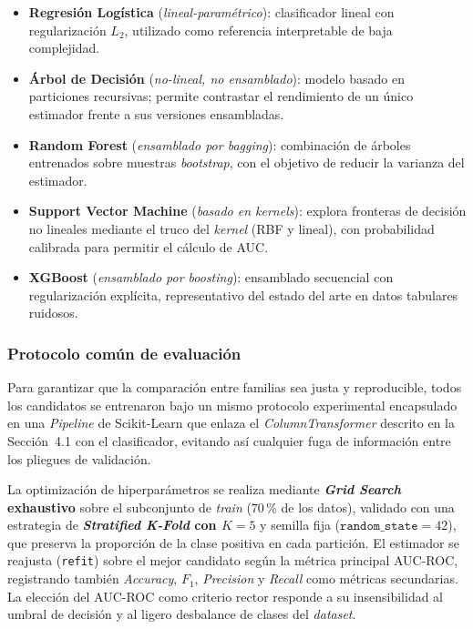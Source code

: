 \documentclass[11pt,a4paper]{article}
\begin{document}
\begin{itemize}
    \item \textbf{Regresión Logística} (\textit{lineal-paramétrico}): clasificador lineal con regularización $L_2$, utilizado como referencia interpretable de baja complejidad.
    \item \textbf{Árbol de Decisión} (\textit{no-lineal, no ensamblado}): modelo basado en particiones recursivas; permite contrastar el rendimiento de un único estimador frente a sus versiones ensambladas.
    \item \textbf{Random Forest} (\textit{ensamblado por \textit{bagging}}): combinación de árboles entrenados sobre muestras \textit{bootstrap}, con el objetivo de reducir la varianza del estimador.
    \item \textbf{Support Vector Machine} (\textit{basado en \textit{kernels}}): explora fronteras de decisión no lineales mediante el truco del \textit{kernel} (RBF y lineal), con probabilidad calibrada para permitir el cálculo de AUC.
    \item \textbf{XGBoost} (\textit{ensamblado por \textit{boosting}}): ensamblado secuencial con regularización explícita, representativo del estado del arte en datos tabulares ruidosos.
\end{itemize}

\subsubsection{Protocolo común de evaluación}

Para garantizar que la comparación entre familias sea justa y reproducible, todos los candidatos se entrenaron bajo un mismo protocolo experimental encapsulado en una \textit{Pipeline} de Scikit-Learn que enlaza el \textit{ColumnTransformer} descrito en la Sección~4.1 con el clasificador, evitando así cualquier fuga de información entre los pliegues de validación.

La optimización de hiperparámetros se realiza mediante \textbf{\textit{Grid Search} exhaustivo} sobre el subconjunto de \textit{train} (70\,\% de los datos), validado con una estrategia de \textbf{\textit{Stratified K-Fold} con $K=5$} y semilla fija ($\texttt{random\_state}=42$), que preserva la proporción de la clase positiva en cada partición. El estimador se reajusta (\texttt{refit}) sobre el mejor candidato según la métrica principal AUC-ROC, registrando también \textit{Accuracy}, $F_1$, \textit{Precision} y \textit{Recall} como métricas secundarias. La elección del AUC-ROC como criterio rector responde a su insensibilidad al umbral de decisión y al ligero desbalance de clases del \textit{dataset}.
\end{document}
